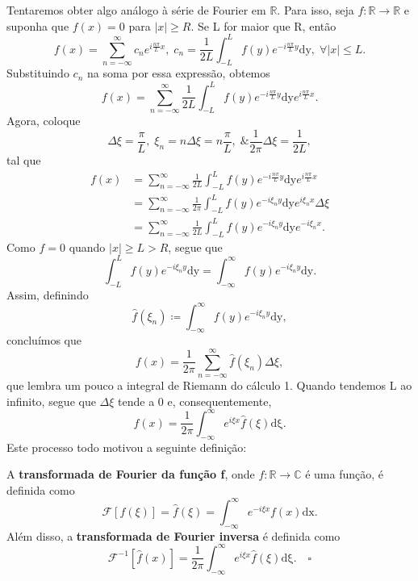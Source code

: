 \documentclass[../pde_notes.tex]{subfiles}
\begin{document}
Tentaremos obter algo análogo à série de Fourier em \(\mathbb{R}\). Para isso, seja \(f:\mathbb{R}\rightarrow \mathbb{R}\) e suponha que \(f(x) = 0\) para \(|x|\geq R.\) Se L for maior que R, então
\[
	f(x) = \sum\limits_{n=-\infty}^{\infty}c_{n}e^{i \frac{n\pi }{L}x},\; c_{n} = \frac{1}{2L}\int_{-L}^{L}f(y)e^{-i \frac{n\pi }{L}y} \mathrm{dy},\; \forall |x|\leq L.
\]
Substituindo \(c_{n}\) na soma por essa expressão, obtemos
\[
	f(x) = \sum\limits_{n=-\infty}^{\infty}\frac{1}{2L}\int_{-L}^{L}f(y)e^{-i \frac{n\pi }{L}y} \mathrm{dy}e^{i \frac{n\pi }{L}x}.
\]
Agora, coloque
\[
	\Delta \xi  = \frac{\pi }{L},\; \xi_{n} = n \Delta \xi  = n \frac{\pi }{L},\;\& \frac{1}{2\pi }\Delta \xi  = \frac{1}{2L},
\]
tal que
\begin{align*}
	f(x) & = \sum\limits_{n=-\infty}^{\infty}\frac{1}{2L}\int_{-L}^{L}f(y)e^{-i \frac{n\pi }{L}y} \mathrm{dy}e^{i \frac{n\pi }{L}x} \\
	     & = \sum\limits_{n=-\infty}^{\infty}\frac{1}{2\pi }\int_{-L}^{L}f(y)e^{-i \xi_{n}y} \mathrm{dy}e^{i\xi_{n}x}\Delta \xi     \\
	     & = \sum\limits_{n=-\infty}^{\infty}\frac{1}{2L}\int_{-L}^{L}f(y)e^{-i \xi_{n}y} \mathrm{dy}e^{-i\xi_{n}x}.
\end{align*}
Como \(f = 0\) quando \(|x|\geq L > R\), segue que
\[
	\int_{-L}^{L}f(y)e^{-i\xi_{n}y} \mathrm{dy} = \int_{-\infty}^{\infty}f(y)e^{-i\xi_{n}y} \mathrm{dy}.
\]
Assim, definindo
\[
	\hat{f}(\xi_{n}) \coloneqq \int_{-\infty}^{\infty}f(y)e^{-i\xi_{n}y} \mathrm{dy},
\]
concluímos que
\[
	f(x) =\frac{1}{2\pi } \sum\limits_{n=-\infty}^{\infty}\hat{f}(\xi_{n})\Delta \xi,
\]
que lembra um pouco a integral de Riemann do cálculo 1. Quando tendemos L ao infinito, segue que \(\Delta \xi \) tende a 0 e, consequentemente,
\[
	f(x) = \frac{1}{2\pi }\int_{-\infty}^{\infty}e^{i\xi x}\hat{f}(\xi ) \mathrm{d\xi }.
\]
Este processo todo motivou a seguinte definição:
\begin{def*}
	A \textbf{transformada de Fourier da função f}, onde \(f:\mathbb{R}\rightarrow \mathbb{C}\) é uma função, é definida como
	\[
		\mathcal{F}[f(\xi )] = \hat{f}(\xi) = \int_{-\infty}^{\infty}e^{-i\xi x}f(x) \mathrm{dx}.
	\]
	Além disso, a \textbf{transformada de Fourier inversa} é definida como
	\[
		\mathcal{F}^{-1}[\hat{f}(x)] = \frac{1}{2\pi }\int_{-\infty}^{\infty}e^{i\xi x}\hat{f}(\xi ) \mathrm{d\xi }. \quad \square
	\]
\end{def*}
\end{document}
